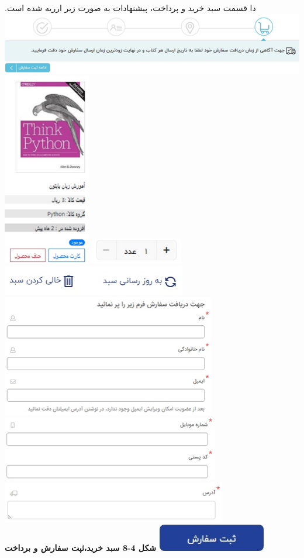 \documentclass[13pt]{article}
\begin{document}
دا قسمت سبد خرید و پرداخت، پیشنهادات به صورت زیر ارریه شده است.
\includegraphics[width=451pt]{img-5.png}{\large  }\includegraphics[width=115pt]{img-18.png}{\large 
\includegraphics[width=108pt]{img-17.png} }\includegraphics[width=228pt]{img-19.png}{\large  }\includegraphics[width=265pt]{img-20.png}{\Large  }\includegraphics[width=270pt]{img-21.png}{\Large  }\includegraphics[width=279pt]{img-22.png}{\Large  }\includegraphics[width=136pt]{img-23.png}{\Large  }
\textbf{{\footnotesize شکل 4-8 سبد خرید،ثپت سفارش و برداخت}}
\end{document}

